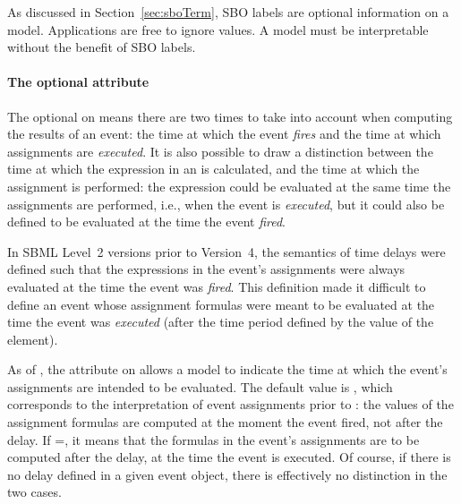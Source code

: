 As discussed in Section~\ref{sec:sboTerm}, SBO labels are optional
information on a model.  Applications are free to ignore
 values.  A model must be interpretable without the
benefit of SBO labels.

\begin{blockChanged}

\paragraph{The optional  attribute}
\label{sec:event-usevaluesfromtriggertime}

The optional \Delay on \Event means there are two times to take
into account when computing the results of an event: the time at
which the event \emph{fires} and the time at which assignments are
\emph{executed}.  It is also possible to draw a distinction
between the time at which the expression in an \EventAssignment is
calculated, and the time at which the assignment is performed: the
expression could be evaluated at the same time the assignments are
performed, i.e., when the event is \emph{executed}, but it could
also be defined to be evaluated at the time the event
\emph{fired}.

In SBML Level~2 versions prior to Version~4, the semantics of
\Event time delays were defined such that the expressions in the
event's assignments were always evaluated at the time the event
was \emph{fired}.  This definition made it difficult to define an
event whose assignment formulas were meant to be evaluated at the
time the event was \emph{executed} (\ie after the time period
defined by the value of the \Delay element).

As of \sbmltwofour, the  attribute
on \Event allows a model to indicate the time at which the event's
assignments are intended to be evaluated.  The default value is
, which corresponds to the interpretation of event
assignments prior to \sbmltwofour: the values of the assignment
formulas are computed at the moment the event fired, not after the
delay.  If =, it means
that the formulas in the event's assignments are to be computed
after the delay, at the time the event is executed.  Of course, if
there is no delay defined in a given event object, there is
effectively no distinction in the two cases.

\end{blockChanged}


